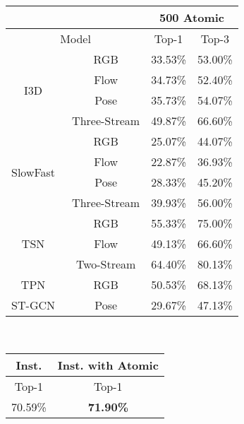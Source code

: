 \documentclass[10pt,twocolumn,letterpaper]{article}
\begin{document}
\begin{table*}[hbt!]
\begin{center}
{\small 
        \begin{tabular}{c|c|c|c}
            \hline
            \multicolumn{2}{c|}{} &
            \multicolumn{2}{c}{500 Atomic} \\
            \hline
              \multicolumn{2}{c|}{Model}   & Top-1 & Top-3  \\
            \hline
            \multirow{4}{*}{I3D~\cite{i3d}} & RGB & 33.53\% & 53.00\%   \\
            & Flow                                & 34.73\% & 52.40\% \\
            & Pose                                & 35.73\% & 54.07\%  \\
            & Three-Stream                        & 49.87\% & 66.60\%  \\
            \hline
            \multirow{4}{*}{SlowFast~\cite{slowfast}} & RGB & 25.07\% & 44.07\%  \\
            & Flow                                          & 22.87\% & 36.93\%  \\
            & Pose                                          & 28.33\% & 45.20\%  \\
            & Three-Stream                                  & 39.93\% & 56.00\%  \\
            \hline
            \multirow{3}{*}{TSN~\cite{TSN}} & RGB & 55.33\% & 75.00\% \\
                                 & Flow & 49.13\% & 66.60\% \\
                                 & Two-Stream & 64.40\% & 80.13\% \\
            \hline
            \multirow{1}{*}{TPN~\cite{TPN}} & RGB & 50.53\% & 68.13\% \\
            \hline
            \multirow{1}{*}{ST-GCN~\cite{stgcn}} & Pose & 29.67\% & 47.13\% \\
            \hline
        \end{tabular}
}
\endminipage
~~~~~
{\small 
        \begin{tabular}{c|c}
            \hline
            \multicolumn{1}{c|}{Inst.} &
            \multicolumn{1}{c}{Inst. with Atomic} \\
            \hline
            Top-1 & Top-1  \\
            \hline
             70.59\% & \bf{71.90}\%  \\

\end{tabular}}
\end{center}
\end{table*}
\end{document}
